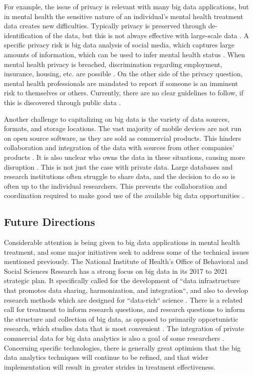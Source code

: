 \documentclass[sigconf]{acmart}
\begin{document}
For example, the issue of privacy is relevant with many big data applications, but in mental health the sensitive nature of an individual's mental health treatment data creates new difficulties. Typically privacy is preserved through de-identification of the data, but this is not always effective with large-scale data \cite{bigdatabipolar}. A specific privacy risk is big data analysis of social media, which captures large amounts of information, which can be used to infer mental health status \cite{detectdepressionsocialmedia}. When mental health privacy is breached, discrimination regarding employment, insurance, housing, etc. are possible \cite{bigdatabipolar}. On the other side of the privacy question, mental health professionals are mandated to report if someone is an imminent risk to themselves or others. Currently, there are no clear guidelines to follow, if this is discovered through public data \cite{detectdepressionsocialmedia}.

Another challenge to capitalizing on big data is the variety of data sources, formats, and storage locations. The vast majority of mobile devices are not run on open source software, as they are sold as commercial products. This hinders collaboration and integration of the data with sources from other companies' products \cite{bdfragment}. It is also unclear who owns the data in these situations, causing more disruption \cite{bigdatabipolar}. This is not just the case with private data. Large databases and research institutions often struggle to share data, and the decision to do so is often up to the individual researchers. This prevents the collaboration and coordination required to make good use of the available big data opportunities \cite{openinfrastructure}.

\subsection{Future Directions}

Considerable attention is being given to big data applications in mental health treatment, and some major initiatives seek to address some of the technical issues mentioned previously. The National Institute of Health's Office of Behavioral and Social Sciences Research has a strong focus on big data in its 2017 to 2021 strategic plan. It specifically called for the development of ``data infrastructure that promotes data sharing, harmonization, and integration``, and also to develop research methods which are designed for ``data-rich`` science \cite{nihstrategy}. There is a related call for treatment to inform research questions, and research questions to inform the structure and collection of big data, as opposed to primarily opportunistic research, which studies data that is most convenient \cite{bdmhtxfuture}.  The integration of private commercial data for big data analytics is also a goal of some researchers \cite{bdfragment}. Concerning specific technologies, there is generally great optimism that the big data analytics techniques will continue to be refined, and that wider implementation will result in greater strides in treatment effectiveness. 
\end{document}
